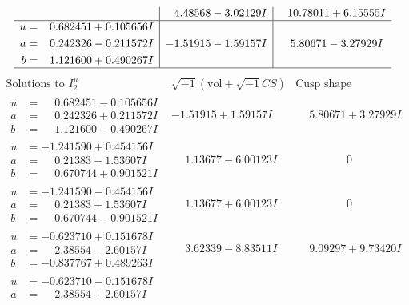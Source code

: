 \documentclass[1p]{elsarticle_modified}
\theoremstyle{definition}
\newcommand{\I}{\sqrt{-1}}
\begin{document}
$$\begin{array}{c|c|c}
 & \phantom{-}4.48568 - 3.02129 I & \phantom{-}10.78011 + 6.15555 I \\ \hline\begin{aligned}
u &= \phantom{-}0.682451 + 0.105656 I \\
a &= \phantom{-}0.242326 - 0.211572 I \\
b &= \phantom{-}1.121600 + 0.490267 I\end{aligned}
 & -1.51915 - 1.59157 I & \phantom{-}5.80671 - 3.27929 I\\
 \hline 
 \end{array}$$\newpage$$\begin{array}{c|c|c}  
\text{Solutions to }I^u_{2}& \I (\text{vol} + \sqrt{-1}CS) & \text{Cusp shape}\\
 \hline 
\begin{aligned}
u &= \phantom{-}0.682451 - 0.105656 I \\
a &= \phantom{-}0.242326 + 0.211572 I \\
b &= \phantom{-}1.121600 - 0.490267 I\end{aligned}
 & -1.51915 + 1.59157 I & \phantom{-}5.80671 + 3.27929 I \\ \hline\begin{aligned}
u &= -1.241590 + 0.454156 I \\
a &= \phantom{-}0.21383 - 1.53607 I \\
b &= \phantom{-}0.670744 + 0.901521 I\end{aligned}
 & \phantom{-}1.13677 - 6.00123 I & \phantom{-0.000000 } 0 \\ \hline\begin{aligned}
u &= -1.241590 - 0.454156 I \\
a &= \phantom{-}0.21383 + 1.53607 I \\
b &= \phantom{-}0.670744 - 0.901521 I\end{aligned}
 & \phantom{-}1.13677 + 6.00123 I & \phantom{-0.000000 } 0 \\ \hline\begin{aligned}
u &= -0.623710 + 0.151678 I \\
a &= \phantom{-}2.38554 - 2.60157 I \\
b &= -0.837767 + 0.489263 I\end{aligned}
 & \phantom{-}3.62339 - 8.83511 I & \phantom{-}9.09297 + 9.73420 I \\ \hline\begin{aligned}
u &= -0.623710 - 0.151678 I \\
a &= \phantom{-}2.38554 + 2.60157 I \\

\end{aligned}
\end{array}$$
\end{document}
